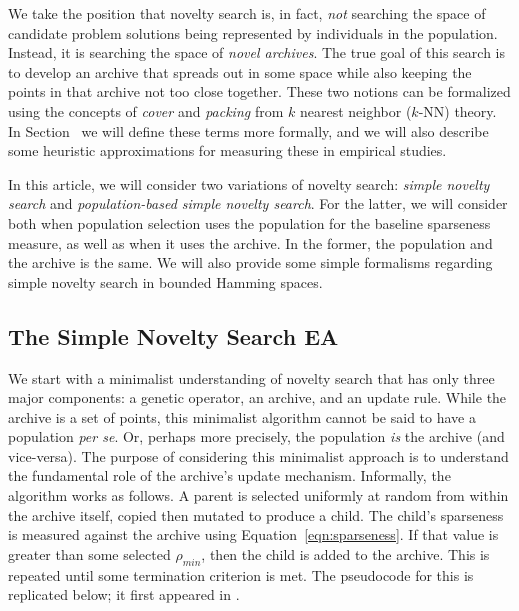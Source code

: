 \documentclass[twoside]{article}
\begin{document}
We take the position that novelty search is, in fact, \emph{not} searching the space of candidate problem solutions being represented by individuals in the population.  Instead, it is searching the space of \emph{novel archives}.  The true goal of this search is to develop an archive that spreads out in some space while also keeping the points in that archive not too close together.  These two notions can be formalized using the concepts of \emph{cover} and \emph{packing} from $k$ nearest neighbor ($k$-NN) theory.  In Section~\pageref{subsec:knn} we will define these terms more formally, and we will also describe some heuristic approximations for measuring these in empirical studies.

In this article, we will consider two variations of novelty search:  \emph{simple novelty search} and \emph{population-based simple novelty search}.  For the latter, we will consider both when population selection uses the population for the baseline sparseness measure, as well as when it uses the archive.   In the former, the population and the archive is the same.  We will also provide some simple formalisms regarding  simple novelty search in bounded Hamming spaces.

\subsection{The Simple Novelty Search EA}
\label{subsec:sns}

We start with a minimalist understanding of novelty search that has only three major components: a genetic operator, an archive, and an update rule.  While the archive is a set of points, this minimalist algorithm cannot be said to have a population \textit{per se}.  Or, perhaps more precisely, the population \emph{is} the archive (and vice-versa).  The purpose of considering this minimalist approach is to understand the fundamental role of the archive's update mechanism.  Informally, the algorithm works as follows.  A parent is selected uniformly at random from within the archive itself, copied then mutated to produce a child.  The child's sparseness is measured against the archive using Equation~\ref{eqn:sparseness}.  If that value is greater than some selected $\rho_{min}$, then the child is added to the archive.  This is repeated until some termination criterion is met.  The pseudocode for this is replicated below; it first appeared in \cite{Wiegand2020flairs}.
\end{document}
